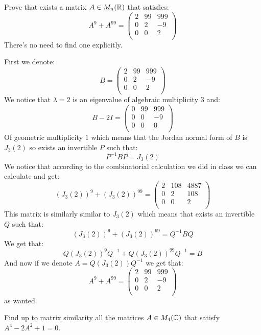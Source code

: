 \documentclass[11pt, a4paper]{article}
\begin{document}
\begin{exercise}
  Prove that exists a matrix $A\in M_n(\mathbb{R})$ that satisfies:
\[
  A^9+A^{99} = \begin{pmatrix}
  2 & 99 & 999\\
  0 & 2 & -9\\
  0 & 0 & 2\\
\end{pmatrix}
\] There's no need to find one explicitly.
\end{exercise}
\begin{solution}
First we denote:
\[
  B = \begin{pmatrix}
  2 & 99 & 999\\
  0 & 2 & -9\\
  0 & 0 & 2\\
  \end{pmatrix}
\]
We notice that $\lambda = 2$ is an eigenvalue of algebraic multiplicity $3$
and:
\[
  B - 2I = \begin{pmatrix}
  0 & 99 & 999\\
  0 & 0 & -9\\
  0 & 0 & 0\\
  \end{pmatrix}
\]
Of geometric multiplicity $1$ which means that the Jordan normal form of $B$
is $J_3(2)$ so exists an invertible $P$ such that:
\[
  P^{-1}BP = J_3(2)
\]
We notice that according to the combinatorial calculation we did in class we
can calculate and get:
\[
(J_3(2))^9 + (J_3(2))^{99} = \begin{pmatrix}
  2 & 108 & 4887\\
  0 & 2 & 108\\
  0 & 0 & 2\\
\end{pmatrix}
\]
This matrix is similarly similar to $J_3(2)$ which means that exists an invertible
$Q$ such that:
\[
  (J_3(2))^9 + (J_3(2))^{99} = Q^{-1}BQ
\]
We get that:
\[
  Q (J_3(2))^9 Q^{-1} + Q (J_3(2))^{99} Q^{-1} = B
\]
And now if we denote $A = Q (J_3(2)) Q^{-1}$ we get that:
\[
  A^9+A^{99} = \begin{pmatrix}
  2 & 99 & 999\\
  0 & 2 & -9\\
  0 & 0 & 2\\
  \end{pmatrix}
\]
as wanted.
\end{solution}

\begin{exercise}
  Find up to matrix similarity all the matrices $A \in M_4(\mathbb{C})$ that
  satisfy $A^4 - 2A^2 + 1 = 0$.
\end{exercise}
\end{document}
